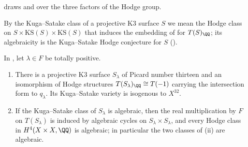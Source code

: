  draws  and  over
the three factors of the Hodge group.

By the Kuga--Satake class of a projective K3 surface $S$ we mean the Hodge
class on $S\times\mathrm{KS}(S)\times\mathrm{KS}(S)$ that induces the embedding
of \cite[Proposition~11.7]{paperI} for $T(S)_{\QQ}$; its algebraicity is the Kuga--Satake
Hodge conjecture for $S$ (\cite[Remark~11.8]{paperI}).

\begin{theorem}\label{thm:mumfordks}
In , let $\lambda\in F$ be totally positive.
\begin{enumerate}[label=\textup{(\roman*)},nosep,leftmargin=2.6em]
\item There is a projective K3 surface $S_{\lambda}$ of Picard number
  thirteen and an isomorphism of Hodge structures
  $T(S_{\lambda})_{\QQ}\cong T(-1)$ carrying the intersection form to
  $q_{\lambda}$. Its Kuga--Satake variety is isogenous to $X^{32}$.
\item If the Kuga--Satake class of $S_{\lambda}$ is algebraic, then the real
  multiplication by $F$ on $T(S_{\lambda})$ is induced by algebraic cycles on
  $S_{\lambda}\times S_{\lambda}$, and every Hodge class in
  $H^{4}(X\times X,\QQ)$ is algebraic; in particular the two classes of
  (ii) are algebraic.
\end{enumerate}
\end{theorem}

